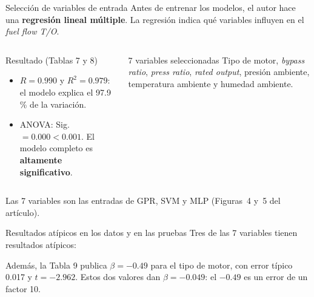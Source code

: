 \documentclass{beamer}
\begin{document}
\begin{frame}{Selección de variables de entrada}
    \justifying\small
    Antes de entrenar los modelos, el autor hace una \textbf{regresión lineal múltiple}. La regresión indica qué variables influyen en el \textit{fuel flow T/O}.
    \bigskip

    \begin{columns}[c]
    \column{5.6cm}
    \begin{block}{Resultado (Tablas 7 y 8)}
        \begin{itemize}
            \item $R = 0.990$ y $R^2 = 0.979$: el modelo explica el 97.9\,\% de la variación.
            \item ANOVA: Sig. $= 0.000 < 0.001$. El modelo completo es \textbf{altamente significativo}.
        \end{itemize}
    \end{block}
    \column{5.6cm}
    \begin{alertblock}{7 variables seleccionadas}
        Tipo de motor, \textit{bypass ratio}, \textit{press ratio}, \textit{rated output}, presión ambiente, temperatura ambiente y humedad ambiente.
    \end{alertblock}
    \end{columns}
    \bigskip
    Las 7 variables son las entradas de GPR, SVM y MLP (Figuras~4 y~5 del artículo).
\end{frame}

\begin{frame}{Resultados atípicos en los datos y en las pruebas}
    \justifying\small
    Tres de las 7 variables tienen resultados atípicos:
    \begin{table}
    \centering
    \end{table}
    \medskip
    \footnotesize Además, la Tabla 9 publica $\beta=-0.49$ para el tipo de motor, con error típico 0.017 y $t=-2.962$. Estos dos valores dan $\beta = -0.049$: el $-0.49$ es un error de un factor 10.
\end{frame}
\end{document}
